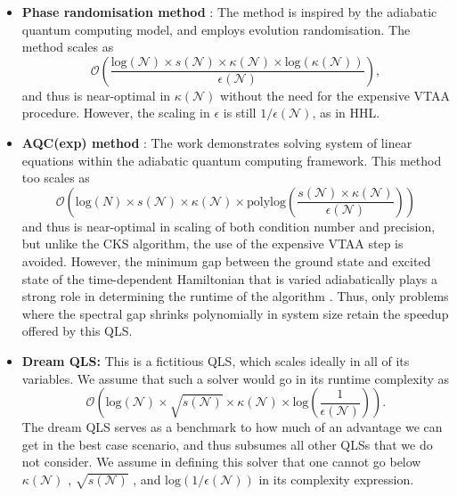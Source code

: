\documentclass[%
 reprint,
 superscriptaddress,
 amsmath,amssymb,
 aps,
 pra,
floatfix,
nofootinbib,
]{revtex4-2}
\theoremstyle{definition}
\theoremstyle{remark}
\begin{document}
\begin{itemize}
\item 
\textbf{Phase randomisation method} \cite{prm}: 
The method is inspired by the adiabatic quantum computing model, and employs evolution randomisation. The method scales as 
$$\mathcal{O}\left(\frac{\mathrm{log}(\mathcal{N}) \times s(\mathcal{N}) \times \kappa(\mathcal{N}) \times \mathrm{log}(\kappa(\mathcal{N}))}{\epsilon(\mathcal{N})}\right),$$
and thus is near-optimal in $\kappa(\mathcal{N})$ without the need for the expensive VTAA procedure. However, the scaling in $\epsilon$ is still $1/\epsilon(\mathcal{N})$, as in HHL. 

\item \textbf{AQC(exp) method} \cite{toa}: 
The work demonstrates solving system of linear equations within the adiabatic quantum computing framework. This method too scales as 
$$\mathcal{O}\left(\mathrm{log}(N) \times s(\mathcal{N})  \times \kappa(\mathcal{N})\times \mathrm{polylog}\left(\frac{s(\mathcal{N}) \times \kappa(\mathcal{N})}{\epsilon(\mathcal{N})}\right) \right)$$ 
and thus is near-optimal in scaling of both condition number and precision, but unlike the CKS algorithm, the use of the expensive VTAA step is avoided. However, the minimum gap between the ground state and excited state of the time-dependent Hamiltonian that is varied adiabatically plays a strong role in determining the runtime of the algorithm \cite{toa}. Thus, only problems where the spectral gap shrinks polynomially in system size retain the speedup offered by this QLS. 

\item \textbf{Dream QLS: }
This is a fictitious QLS, which scales ideally in all of its variables. We assume that such a solver would go in its runtime complexity as 
$$\mathcal{O}\left(\mathrm{log}(\mathcal{N}) \times \sqrt{s(\mathcal{N})} \times \kappa(\mathcal{N}) \times \mathrm{log}\left(\frac{1}{\epsilon(\mathcal{N})}\right) \right).$$
The dream QLS serves as a benchmark to how much of an advantage we can get in the best case scenario, and thus subsumes all other QLSs that we do not consider. We assume in defining this solver that one cannot go below $\kappa(\mathcal{N})$ \cite{Harrow2009QuantumEquations} , $\sqrt{s(\mathcal{N})}$ \cite{mori2026sparsity}, and $\mathrm{log}(1/\epsilon(\mathcal{N}))$ \cite{morales} in its complexity expression. 
\end{itemize} 
\end{document}
